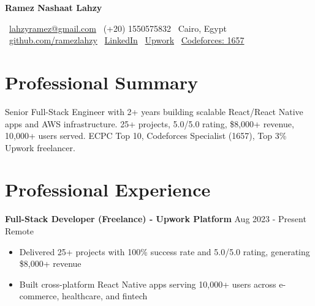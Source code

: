 \documentclass[8pt,a4paper]{article}
\newcommand{\cvheader}[1]{%
    \begin{center}
        {\Large\bfseries\color{primarycolor} #1}
    \end{center}
}
\newcommand{\contactinfo}[1]{%
    \begin{center}
        \small #1
    \end{center}
    \vspace{0.02em}
}
\newcommand{\cventry}[4]{%
    \textbf{#1} \hfill {\small\color{secondarycolor} #2} \hfill {\footnotesize\textit{#3}}\\
    #4
    \vspace{0.02em}
}
\begin{document}

\cvheader{Ramez Nashaat Lahzy}

\contactinfo{
\faEnvelope\ \href{mailto:lahzyramez@gmail.com}{lahzyramez@gmail.com} \quad
\faPhone\ (+20) 1550575832 \quad
\faMapMarker\ Cairo, Egypt \\
\faGithub\ \href{https://github.com/ramezlahzy}{github.com/ramezlahzy} \quad
\faLinkedin\ \href{https://linkedin.com/in/ramez-lahzy-37188021a/}{LinkedIn} \quad
\faGlobe\ \href{https://www.upwork.com/freelancers/ramezn3}{Upwork} \quad
\faCode\ \href{https://codeforces.com/profile/Ramez__}{Codeforces: 1657}
}


\section{Professional Summary}

Senior Full-Stack Engineer with 2+ years building scalable React/React Native apps and AWS infrastructure. 25+ projects, 5.0/5.0 rating, \$8,000+ revenue, 10,000+ users served. ECPC Top 10, Codeforces Specialist (1657), Top 3\% Upwork freelancer.


\section{Professional Experience}

\cventry{ Full-Stack Developer (Freelance) - Upwork Platform}{Aug 2023 - Present}{}{Remote}{
\begin{itemize}
    \item Delivered 25+ projects with 100\% success rate and 5.0/5.0 rating, generating \$8,000+ revenue
    \item Built cross-platform React Native apps serving 10,000+ users across e-commerce, healthcare, and fintech
\end{itemize}
}
\end{document}
